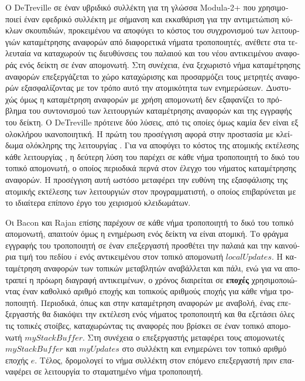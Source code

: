 \begin{greek}
Ο DeTreville \cite{detreville1990experience} σε έναν υβριδικό
συλλέκτη για τη γλώσσα Modula-2+ που χρησιμοποιεί έναν
εφεδρικό συλλέκτη με σήμανση και εκκαθάριση για την
αντιμετώπιση κύκλων σκουπιδιών, προκειμένου να αποφύγει το
κόστος του συγχρονισμού των λειτουργιών καταμέτρησης αναφορών
από διαφορετικά νήματα τροποποιητές, ανέθετε στα τελευταία
να καταχωρούν τις διευθύνσεις του παλαιού και του νέου
αντικειμένου αναφοράς ενός δείκτη σε έναν απομονωτή. Στη
συνέχεια, ένα ξεχωριστό νήμα καταμέτρησης αναφορών επεξεργάζεται
το χώρο καταχώρισης και προσαρμόζει τους μετρητές αναφορών
εξασφαλίζοντας με τον τρόπο αυτό την ατομικότητα των ενημερώσεων.
Δυστυχώς όμως η καταμέτρηση αναφορών με χρήση απομονωτή δεν
εξαφανίζει το πρόβλημα του συντονισμού των λειτουργιών
καταμέτρησης αναφορών και της εγγραφής του δείκτη. Ο
DeTreville πρότεινε δύο λύσεις, από τις οποίες όμως καμία δεν
είναι εξ ολοκλήρου ικανοποιητική. Η πρώτη του προσέγγιση αφορά
στην προστασία με κλείδωμα ολόκληρης της λειτουργίας
. Για να αποφύγει το κόστος της ατομικής
εκτέλεσης κάθε λειτουργίας , η δεύτερη λύση
του παρέχει σε κάθε νήμα τροποποιητή το δικό του τοπικό
απομονωτή, ο οποίος περιοδικά περνά στον έλεγχο του νήματος
καταμέτρησης αναφορών. Η προσέγγιση αυτή ωστόσο μεταφέρει
την ευθύνη της εξασφάλισης της ατομικής εκτέλεσης των
λειτουργιών  στον προγραμματιστή, ο οποίος
επιβαρύνεται με το ιδιαίτερα επίπονο έργο του χειρισμού
κλειδωμάτων.

Οι Bacon και Rajan \cite{DBLP:conf/ecoop/BaconR01} επίσης
παρέχουν σε κάθε νήμα τροποποιητή το δικό του τοπικό
απομονωτή, απαιτούν όμως η ενημέρωση ενός δείκτη να είναι
ατομική. Το φράγμα εγγραφής του τροποποιητή σε έναν επεξεργαστή
προσθέτει την παλαιά και την καινούρια τιμή του πεδίου $i$ ενός
αντικειμένου στον τοπικό απομονωτή $localUpdates$. Η καταμέτρηση
αναφορών των τοπικών μεταβλητών αναβάλλεται και πάλι, ενώ για
να αποτραπεί η πρόωρη διαγραφή αντικειμένων, ο χρόνος διαιρείται
σε \textbf{εποχές} χρησιμοποιώντας έναν καθολικό αριθμό εποχής
και τοπικούς αριθμούς εποχής για κάθε νήμα τροποποιητή.
Περιοδικά, όπως και στην καταμέτρηση αναφορών με αναβολή,
ένας επεξεργαστής θα διακόψει την εκτέλεση ενός νήματος
τροποποιητή και θα εξετάσει όλες τις τοπικές στοίβες,
καταχωρώντας τις αναφορές που βρίσκει σε έναν τοπικό απομονωτή
$myStackBuffer$. Στη συνέχεια ο επεξεργαστής μεταφέρει τους
απομονωτές $myStackBuffer$ και $myUpdates$ στο συλλέκτη και
ενημερώνει τον τοπικό αριθμό εποχής $e$. Τέλος, δρομολογεί
το νήμα συλλέκτη στον επόμενο επεξεργαστή πριν επαναφέρει
σε λειτουργία το σταματημένο νήμα τροποποιητή.


\end{greek}

